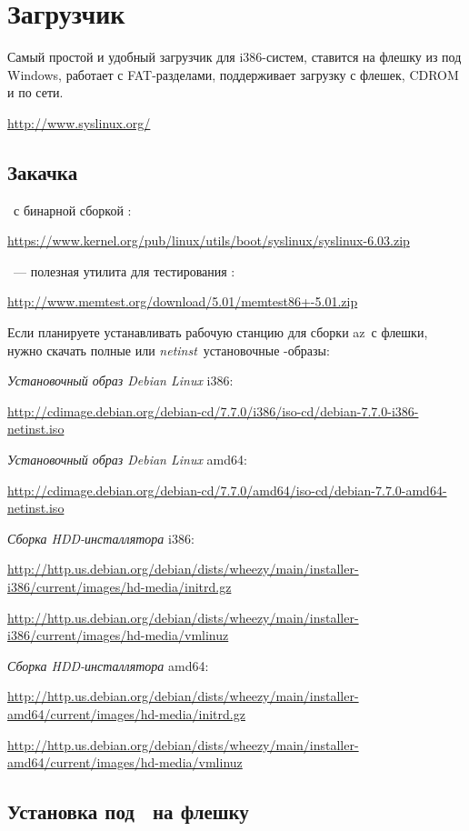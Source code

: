 \section{Загрузчик }

Самый простой и удобный загрузчик для i386-систем, ставится на флешку
из под Windows, работает с FAT-разделами, поддерживает загрузку с флешек, CDROM
и по сети.

\bigskip
\url{http://www.syslinux.org/}

\subsection{Закачка}

\ с бинарной сборкой :

\url{https://www.kernel.org/pub/linux/utils/boot/syslinux/syslinux-6.03.zip}
\bigskip

\ --- полезная утилита для тестирования \ram:

\url{http://www.memtest.org/download/5.01/memtest86+-5.01.zip}
\bigskip 

Если планируете устанавливать рабочую станцию для сборки az\linux\ с флешки,
нужно скачать полные или \emph{netinst}\ установочные -образы: 

\emph{Установочный образ Debian Linux} i386:

\url{http://cdimage.debian.org/debian-cd/7.7.0/i386/iso-cd/debian-7.7.0-i386-netinst.iso}

\emph{Установочный образ Debian Linux} amd64:

\url{http://cdimage.debian.org/debian-cd/7.7.0/amd64/iso-cd/debian-7.7.0-amd64-netinst.iso}

\emph{Сборка HDD-инсталлятора} i386:

\url{http://http.us.debian.org/debian/dists/wheezy/main/installer-i386/current/images/hd-media/initrd.gz}

\url{http://http.us.debian.org/debian/dists/wheezy/main/installer-i386/current/images/hd-media/vmlinuz}

\emph{Сборка HDD-инсталлятора} amd64:

\url{http://http.us.debian.org/debian/dists/wheezy/main/installer-amd64/current/images/hd-media/initrd.gz}

\url{http://http.us.debian.org/debian/dists/wheezy/main/installer-amd64/current/images/hd-media/vmlinuz}

\subsection{Установка под \win\ на флешку}


